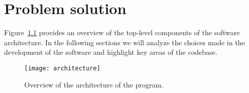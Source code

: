 \chapter{Problem solution}\label{ch:problem-solution}

Figure~\ref{fig:software-architecture} provides an overview of the top-level components of the software architecture.
In the following sections we will analyze the choices made in the development of the software and highlight key areas of
the codebase.

\begin{figure}[h]
    \centering
    \texttt{[image: architecture]}
    \caption{Overview of the architecture of the program.}\label{fig:software-architecture}
\end{figure}






